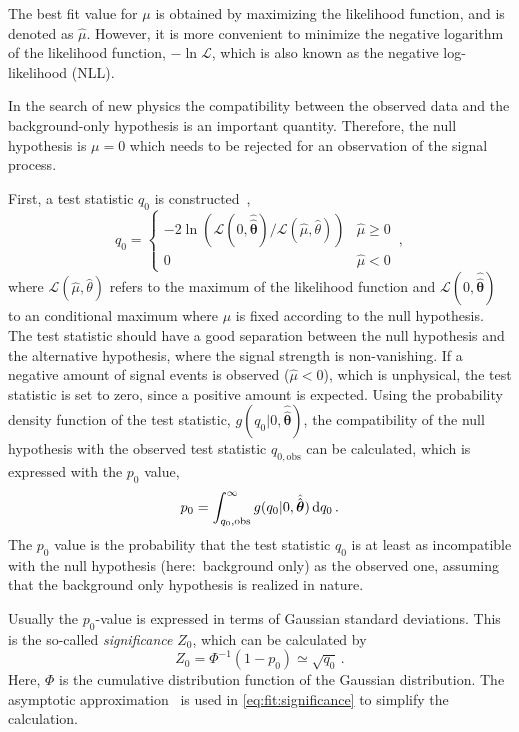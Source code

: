 The best fit value for $\mu$ is obtained by maximizing the likelihood function, and is denoted as $\hat{\mu}$.
However, it is more convenient to minimize the negative logarithm of the likelihood function, $- \ln \mathcal{L}$, which is also known as the negative log-likelihood (NLL).

In the search of new physics the compatibility between the observed data and the background-only hypothesis is an important quantity.
Therefore, the null hypothesis is $\mu = 0$ which needs to be rejected for an observation of the signal process.

First, a test statistic $q_0$ is constructed~\cite{FitATLAS},
\begin{equation}
    q_0 =
    \begin{cases}
        -2 \ln (\mathcal{L}(0, \hat{\hat{\bm{\theta}}}) / \mathcal{L}(\hat{\mu}, \hat{\theta})) & \hat{\mu} \geq 0 \\
        0 &  \hat{\mu} < 0
    \end{cases} \,,
\end{equation}
where $\mathcal{L}(\hat{\mu}, \hat{\theta})$ refers to the maximum of the likelihood function and $\mathcal{L}(0, \hat{\hat{\bm{\theta}}})$ to
an conditional maximum where $\mu$ is fixed according to the null hypothesis.
The test statistic should have a good separation between the null hypothesis and the alternative hypothesis, where the signal strength is non-vanishing.
If a negative amount of signal events is observed ($\hat{\mu} < 0$), which is unphysical, the test statistic is set to zero, since a positive amount is expected.
Using the probability density function of the test statistic, $g(q_0 | 0, \hat{\hat{\bm{\theta}}})$,
the compatibility of the null hypothesis with the observed test statistic $q_{0,\text{obs}}$
can be calculated, which is expressed with the $p_0$ value,
\begin{equation}
    p_0 = \int_{q_0,\text{obs}}^{\infty} g(q_0 | 0, \hat{\hat{\bm{\theta}}}) \dif q_0 \,.
\end{equation}
The $p_0$ value is the probability that the test statistic $q_{0}$
is at least as incompatible with the null hypothesis (here:\ background only) as the observed one, assuming that the background only
hypothesis is realized in nature.

Usually the $p_0$-value is expressed in terms of Gaussian standard deviations.
This is the so-called \emph{significance} $Z_0$, which can be calculated by
\begin{equation}
    \label{eq:fit:significance}
    Z_0 = \Phi^{-1} (1 - p_0) \simeq \sqrt{q_0} \,.
\end{equation}
Here, $\Phi$ is the cumulative distribution function of the Gaussian distribution.
The asymptotic approximation~\cite{FitATLAS} is used in \cref{eq:fit:significance} to simplify the calculation.


